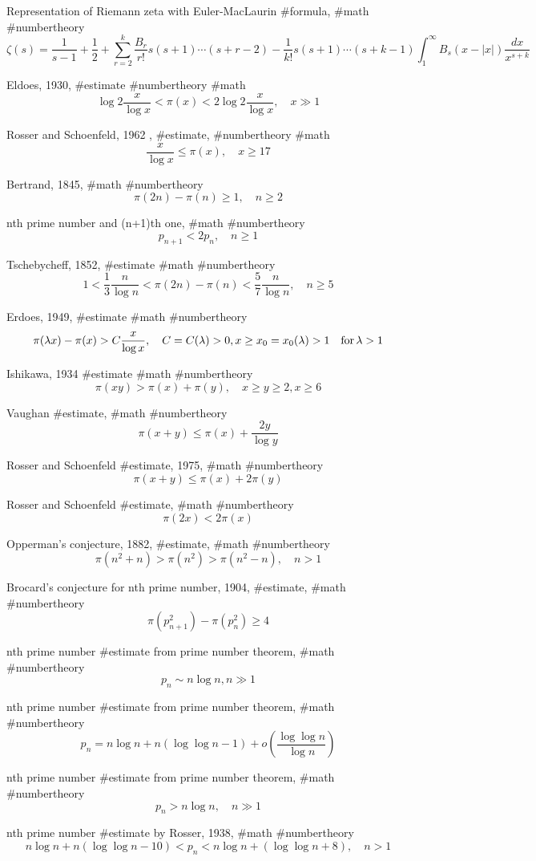Representation of Riemann zeta with Euler-MacLaurin #formula, #math #numbertheory
$$
\zeta(s)=\frac{1}{s-1}+\frac{1}{2}+\sum^k_{r=2}\frac{B_r}{r!}s(s+1)\cdots(s+r-2)-\frac{1}{k!}s(s+1)\cdots(s+k-1)\int^\infty_1 B_s(x-|x|)\frac{dx}{x^{s+k}}
$$

Eldoes, 1930, #estimate #numbertheory #math
$$
\log 2 \frac{x}{\log x}<\pi(x)<2\log 2 \frac{x}{\log x}, \quad x \gg 1
$$

Rosser and Schoenfeld, 1962 , #estimate, #numbertheory #math
$$
\frac{x}{\log x} \le \pi(x), \quad x \ge 17
$$

Bertrand, 1845, #math #numbertheory
$$
\pi(2n)-\pi(n) \ge 1, \quad n \ge 2
$$

nth prime number and (n+1)th one, #math #numbertheory
$$
p_{n+1}<2p_n, \quad n \ge 1
$$

Tschebycheff, 1852, #estimate #math #numbertheory
$$
1<\frac{1}{3}\frac{n}{\log n}<\pi(2n)-\pi(n)<\frac{5}{7}\frac{n}{\log n}, \quad n \ge 5
$$

Erdoes, 1949, #estimate #math #numbertheory
$$
\pi(\lambda x)-\pi(x)>C\frac{x}{\log x},\quad C=C(\lambda)>0, x \ge x_0=x_0(\lambda)>1 \quad {\rm for}\,\lambda>1
$$

Ishikawa, 1934 #estimate #math #numbertheory
$$
\pi(xy)>\pi(x)+\pi(y), \quad x \ge y \ge 2, x \ge 6
$$

Vaughan #estimate, #math #numbertheory
$$
\pi(x+y) \le \pi(x)+\frac{2y}{\log y}
$$

Rosser and Schoenfeld #estimate, 1975, #math #numbertheory
$$
\pi(x+y) \le \pi(x)+2\pi(y)
$$

Rosser and Schoenfeld #estimate, #math #numbertheory
$$
\pi(2x)<2\pi(x)
$$

Opperman’s conjecture, 1882, #estimate, #math #numbertheory
$$
\pi(n^2+n)>\pi(n^2)>\pi(n^2-n), \quad n>1
$$

Brocard’s conjecture for nth prime number, 1904, #estimate, #math #numbertheory
$$
\pi(p_{n+1}^2)-\pi(p_n^2) \ge 4
$$

nth prime number #estimate from prime number theorem, #math #numbertheory
$$
p_n \sim n \log n, n \gg 1
$$

nth prime number #estimate from prime number theorem, #math #numbertheory
$$
p_n=n\log n+n(\log\log n-1)+o\left(\frac{\log\log n}{\log n}\right)
$$

nth prime number #estimate from prime number theorem, #math #numbertheory
$$
p_n > n\log n, \quad n \gg 1
$$

nth prime number #estimate by Rosser, 1938, #math #numbertheory
$$
n\log n+n(\log\log n-10)<p_n<n\log n+(\log\log n+8), \quad n>1
$$

